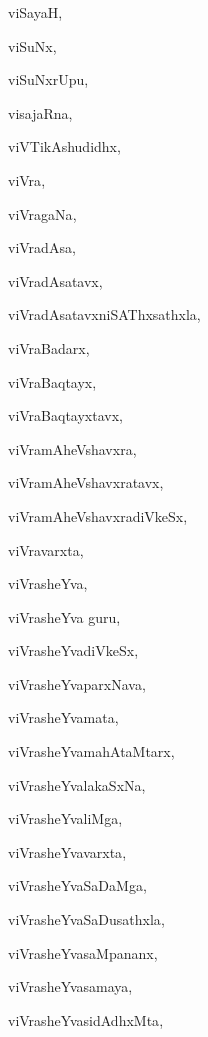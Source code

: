 \begin{multicols}{2}
{viSayaH}, \pageref{viSayaH}

{viSuNx}, \pageref{viSuNx}

{viSuNxrUpu}, \pageref{viSuNxrUpu}

{visajaRna}, \pageref{visajaRna}

{viVTikAshudidhx}, \pageref{viVTikAshudidhx}

{viVra}, \pageref{viVra}

{viVragaNa}, \pageref{viVragaNa}

{viVradAsa}, \pageref{viVradAsa}

{viVradAsatavx}, \pageref{viVradAsatavx}

{viVradAsatavxniSAThxsathxla}, \pageref{viVradAsatavxniSAThxsathxla}

{viVraBadarx}, \pageref{viVraBadarx}

{viVraBaqtayx}, \pageref{viVraBaqtayx}

{viVraBaqtayxtavx}, \pageref{viVraBaqtayxtavx}

{viVramAheVshavxra}, \pageref{viVramAheVshavxra}

{viVramAheVshavxratavx}, \pageref{viVramAheVshavxratavx}

{viVramAheVshavxradiVkeSx}, \pageref{viVramAheVshavxradiVkeSx}

{viVravarxta}, \pageref{viVravarxta}

{viVrasheYva}, \pageref{viVrasheYva}

{viVrasheYva guru}, \pageref{viVrasheYvaguru}

{viVrasheYvadiVkeSx}, \pageref{viVrasheYvadiVkeSx}

{viVrasheYvaparxNava}, \pageref{viVrasheYvaparxNava}

{viVrasheYvamata}, \pageref{viVrasheYvamata}

{viVrasheYvamahAtaMtarx}, \pageref{viVrasheYvamahAtaMtarx}

{viVrasheYvalakaSxNa}, \pageref{viVrasheYvalakaSxNa}

{viVrasheYvaliMga}, \pageref{viVrasheYvaliMga}

{viVrasheYvavarxta}, \pageref{viVrasheYvavarxta}

{viVrasheYvaSaDaMga}, \pageref{viVrasheYvaSaDaMga}

{viVrasheYvaSaDusathxla}, \pageref{viVrasheYvaSaDusathxla}

{viVrasheYvasaMpananx}, \pageref{viVrasheYvasaMpananx}

{viVrasheYvasamaya}, \pageref{viVrasheYvasamaya}

{viVrasheYvasidAdhxMta}, \pageref{viVrasheYvasidAdhxMta}


\end{multicols}
